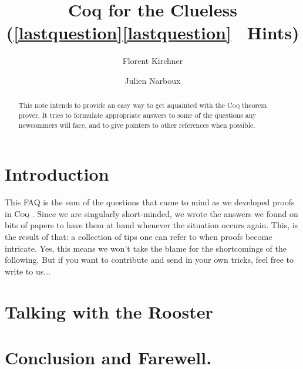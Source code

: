 \documentclass[a4paper]{faq}
\def\Coq{\textsc{Coq }}
\begin{document}



\title{Coq for the Clueless\\
  \large(\ifpdf\ref*{lastquestion}\else\protect\ref{lastquestion}\fi
  \ Hints)
}
\author{Florent Kirchner \and Julien Narboux}
\maketitle


\begin{abstract}
This note intends to provide an easy way to get aquainted with the
\Coq theorem prover. It tries to formulate appropriate answers
to some of the questions any newcommers will face, and to give
pointers to other references when possible.
\end{abstract}


\begin{multicols}{2}
\tableofcontents
\end{multicols}


\newpage
\section{Introduction}
This FAQ is the sum of the questions that came to mind as we developed
proofs in \Coq. Since we are singularly short-minded, we wrote the
answers we found on bits of papers to have them at hand whenever the
situation occurs again. This, is the result of that: a collection of
tips one can refer to when proofs become intricate. Yes, this means we
won't take the blame for the shortcomings of the following. But if you
want to contribute and send in your own tricks, feel free to write to
us...

\section{Talking with the Rooster}				     %
\label{core}							     %

\section{Conclusion and Farewell.}
\label{ccl}
\end{document}
